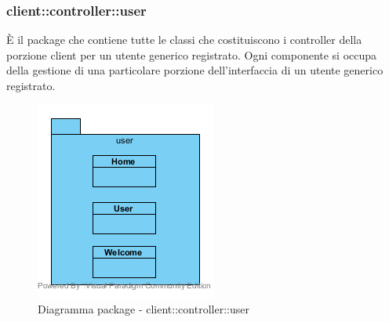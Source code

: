 \vspace{0.5cm}
\subsubsection{client::controller::user}
È il package che contiene tutte le classi che costituiscono i controller della porzione client per un utente generico registrato. Ogni componente si occupa della gestione di una particolare porzione dell'interfaccia di un utente generico registrato.\begin{center}
	\begin{figure}[H]
		\centering \includegraphics[scale=4, max width=\textwidth, max height=\myheight]{../img/diagrammiClassi/client/controller/user.png}
		\caption{Diagramma package - client::controller::user}
	\end{figure}
\end{center}\hypertarget{client::controller::user::Welcome}{}
